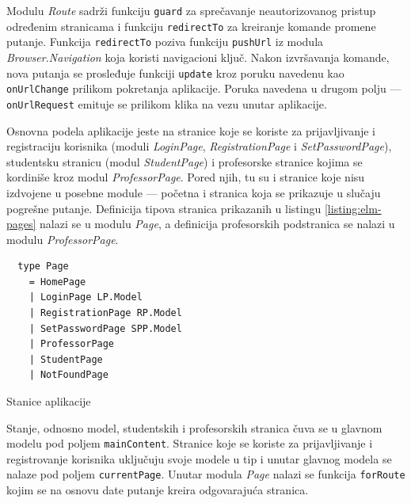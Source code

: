 \documentclass[12pt,oneside]{memoir}
\begin{document}
Modulu \emph{Route} sadrži funkciju \texttt{guard} za sprečavanje
neautorizovanog pristup određenim stranicama i funkciju \texttt{redirectTo} za kreiranje
komande promene putanje. Funkcija \texttt{redirectTo} poziva funkciju \texttt{pushUrl} iz modula
\emph{Browser.Navigation} koja koristi navigacioni ključ. Nakon izvršavanja komande,
nova putanja se prosleđuje funkciji \texttt{update} kroz poruku navedenu kao \texttt{onUrlChange} prilikom
pokretanja aplikacije. Poruka navedena u drugom polju --- \texttt{onUrlRequest} emituje se prilikom klika na
vezu unutar aplikacije. 

Osnovna podela aplikacije jeste na stranice koje se koriste za prijavljivanje i registraciju korisnika
(moduli \emph{LoginPage}, \emph{RegistrationPage} i \emph{SetPasswordPage}), studentsku stranicu (modul \emph{StudentPage})
i profesorske stranice kojima se kordiniše kroz modul \emph{ProfessorPage}. Pored njih, tu su i stranice koje nisu izdvojene u
posebne module --- početna i stranica koja se prikazuje u slučaju pogrešne putanje. Definicija tipova stranica prikazanih u
listingu \ref{listing:elm-pages} nalazi se u modulu \emph{Page}, a definicija profesorskih podstranica se nalazi u modulu \emph{ProfessorPage}.
\begin{listing}[h]
\begin{verbatim}
  type Page
    = HomePage
    | LoginPage LP.Model
    | RegistrationPage RP.Model
    | SetPasswordPage SPP.Model
    | ProfessorPage
    | StudentPage
    | NotFoundPage
\end{verbatim}
\caption{Stanice aplikacije}
\label{listing:elm-pages}
\end{listing}
Stanje, odnosno model, studentskih i profesorskih stranica čuva se u glavnom modelu pod poljem \texttt{mainContent}.
Stranice koje se koriste za prijavljivanje i registrovanje korisnika uključuju svoje modele u tip
i unutar glavnog modela se nalaze pod poljem \texttt{currentPage}. Unutar modula \emph{Page}
nalazi se funkcija \texttt{forRoute} kojim se na osnovu date putanje kreira odgovarajuća stranica.
\end{document}
